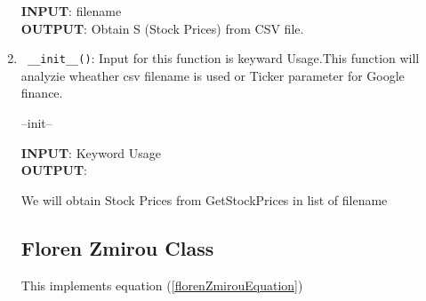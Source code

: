 \begin{enumerate}
\begin{algorithm}
  \bigskip
  \textbf{INPUT}: filename\\
  \textbf{OUTPUT}: Obtain S (Stock Prices) from CSV file.
  \end{algorithm}
  \item \verb! __init__()!: Input for this function is keyward Usage.This function will analyzie wheather csv filename is used or Ticker parameter 
  for Google finance.
  \begin{algorithm}
  \caption{--init--}
  \bigskip
  \textbf{INPUT}: Keyword Usage \\
  \textbf{OUTPUT}:
  \begin{algorithmic}[1]
  \State We  will obtain Stock Prices from GetStockPrices in list of filename
  \end{algorithmic}
  \end{algorithm}
\subsection{Floren Zmirou Class}
This implements equation (\ref{florenZmirouEquation})

\end{enumerate}
